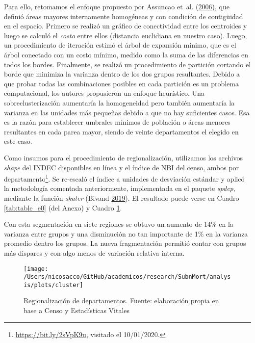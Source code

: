 \documentclass[12pt,spanish,]{article}
\begin{document}
Para ello, retomamos el enfoque propuesto por Assuncao et~al.
(\protect\hyperlink{ref-AssunCao2006}{2006}), que definió áreas mayores
internamente homogéneas y con condición de contigüidad en el espacio.
Primero se realizó un gráfico de conectividad entre los centroides y
luego se calculó el \emph{costo} entre ellos (distancia euclidiana en
nuestro caso). Luego, un procedimiento de iteración estimó el árbol de
expansión mínimo, que es el árbol conectado con un costo mínimo, medido
como la suma de las diferencias en todos los bordes. Finalmente, se
realizó un procedimiento de partición cortando el borde que minimiza la
varianza dentro de los dos grupos resultantes. Debido a que probar todas
las combinaciones posibles en cada partición es un problema
computacional, los autores propusieron un enfoque heurístico. Una
sobreclusterización aumentaría la homogeneidad pero también aumentaría
la varianza en las unidades más pequeñas debido a que no hay suficientes
casos. Esa es la razón para establecer umbrales mínimos de población o
áreas menores resultantes en cada parea mayor, siendo de veinte
departamentos el elegido en este caso.

Como insumos para el procedimiento de regionalización, utilizamos los
archivos \emph{shape} del INDEC disponibles en línea y el índice de NBI
del censo, ambos por departamento\footnote{\url{https://bit.ly/2sVpK9u},
  visitado el 10/01/2020.}. Se re-escaló el índice a unidades de
desviación estándar y aplicó la metodología comentada anteriormente,
implementada en el paquete \emph{spdep}, mediante la función
\emph{skater} (Bivand \protect\hyperlink{ref-Bivand2019}{2019}). El
resultado puede verse en Cuadro \ref{tab:table_e0} (del Anexo) y Cuadro
\ref{fig:cluster}.

Con esta segmentación en siete regiones se obtuvo un aumento de 14\% en
la varianza entre grupos y una disminución no tan importante de 1\% en
la varianza promedio dentro los grupos. La nueva fragmentación permitió
contar con grupos más dispares y con algo menos de variación relativa
interna.

\begin{figure}

{\centering \texttt{[image: /Users/nicosacco/GitHub/academicos/research/SubnMort/analysis/plots/cluster]} 

}

\caption{Regionalización de departamentos. Fuente: elaboración propia en base a Censo y Estadísticas Vitales}\label{fig:cluster}
\end{figure}
\end{document}
